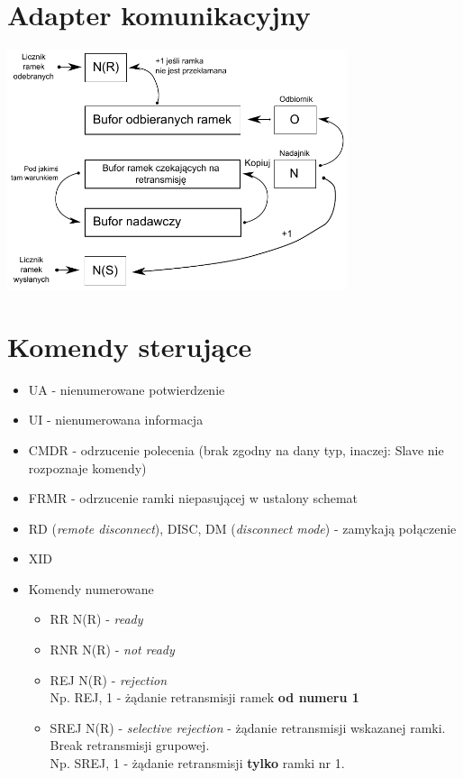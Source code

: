 	\section{Adapter komunikacyjny}
		\includegraphics[width=10cm]{./images/image12.pdf}
	\section{Komendy sterujące}
		\begin{itemize}
			\item UA - nienumerowane potwierdzenie
			\item UI - nienumerowana informacja
			\item CMDR - odrzucenie polecenia (brak zgodny na dany typ, inaczej: Slave nie rozpoznaje komendy)
			\item FRMR - odrzucenie ramki niepasującej w ustalony schemat
			\item RD (\emph{remote disconnect}), DISC, DM (\emph{disconnect mode}) - zamykają połączenie
			\item XID
			\item Komendy numerowane
			\begin{itemize}
				\item RR N(R) - \emph{ready}
				\item RNR N(R) - \emph{not ready}
				\item REJ N(R) - \emph{rejection}\\
				Np. REJ, 1 - żądanie retransmisji ramek \textbf{od numeru 1}
				\item SREJ N(R) - \emph{selective rejection} - żądanie retransmisji wskazanej ramki. Break retransmisji grupowej.\\
				Np. SREJ, 1 - żądanie retransmisji \textbf{tylko} ramki nr 1.
			\end{itemize}
		\end{itemize}

